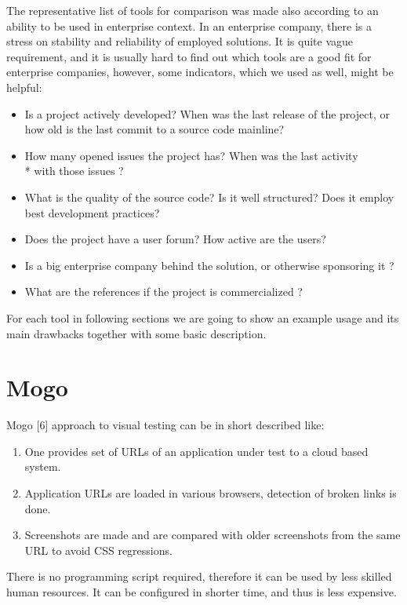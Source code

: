 \documentclass[11pt,oneside,final]{fithesis2}
\begin{document}
The representative list of tools for comparison was made also according to an ability to be used in enterprise context. In an enterprise company, there
is a stress on stability and reliability of employed solutions. It is quite vague requirement, and it is usually hard to find out which tools
are a good fit for enterprise companies, however, some indicators, which we used as well, might be helpful:
\begin{itemize}
 \item Is a project actively developed? When was the last release of the project, or how old is the last commit to a source code mainline?
 \item How many opened issues the project has? When was the last activity \\* with those issues ?
 \item What is the quality of the source code? Is it well structured? Does it employ best development practices?
 \item Does the project have a user forum? How active are the users?
 \item Is a big enterprise company behind the solution, or otherwise sponsoring it ?
 \item What are the references if the project is commercialized ?
\end{itemize}

For each tool in following sections we are going to show an example usage and its main drawbacks together with some basic description.
  
  \section{Mogo}
  Mogo [6] approach to visual testing can be in short described like: 
  \begin{enumerate}
   \item One provides set of URLs of an application under test to a cloud based system.
   \item Application URLs are loaded in various browsers, detection of broken links is done.
   \item Screenshots are made and are compared with older screenshots from the same URL to avoid CSS regressions.
  \end{enumerate}
  
  There is no programming script required, therefore it can be used by less skilled human resources. It can be configured in shorter time, and thus is less expensive.
  
\end{document}
